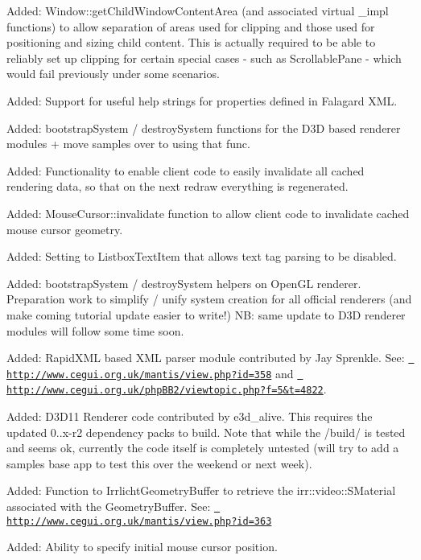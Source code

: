 \begin{DoxyItemize}
\item Added\+: Window\+::get\+Child\+Window\+Content\+Area (and associated virtual \+\_\+impl functions) to allow separation of areas used for clipping and those used for positioning and sizing child content. This is actually required to be able to reliably set up clipping for certain special cases -\/ such as Scrollable\+Pane -\/ which would fail previously under some scenarios.
\item Added\+: Support for useful help strings for properties defined in Falagard X\+ML.
\item Added\+: bootstrap\+System / destroy\+System functions for the D3D based renderer modules + move samples over to using that func.
\item Added\+: Functionality to enable client code to easily invalidate all cached rendering data, so that on the next redraw everything is regenerated.
\item Added\+: Mouse\+Cursor\+::invalidate function to allow client code to invalidate cached mouse cursor geometry.
\item Added\+: Setting to Listbox\+Text\+Item that allows text tag parsing to be disabled.
\item Added\+: bootstrap\+System / destroy\+System helpers on Open\+GL renderer. Preparation work to simplify / unify system creation for all official renderers (and make coming tutorial update easier to write!) NB\+: same update to D3D renderer modules will follow some time soon.
\item Added\+: Rapid\+X\+ML based X\+ML parser module contributed by Jay Sprenkle. See\+: \href{http://www.cegui.org.uk/mantis/view.php?id=358}{\texttt{ http\+://www.\+cegui.\+org.\+uk/mantis/view.\+php?id=358}} and \href{http://www.cegui.org.uk/phpBB2/viewtopic.php?f=5&t=4822}{\texttt{ http\+://www.\+cegui.\+org.\+uk/php\+B\+B2/viewtopic.\+php?f=5\&t=4822}}.
\item Added\+: D3\+D11 Renderer code contributed by e3d\+\_\+alive. This requires the updated 0..\+x-\/r2 dependency packs to build. Note that while the /build/ is tested and seems ok, currently the code itself is completely untested (will try to add a samples base app to test this over the weekend or next week).
\item Added\+: Function to Irrlicht\+Geometry\+Buffer to retrieve the irr\+::video\+::\+S\+Material associated with the Geometry\+Buffer. See\+: \href{http://www.cegui.org.uk/mantis/view.php?id=363}{\texttt{ http\+://www.\+cegui.\+org.\+uk/mantis/view.\+php?id=363}}
\item Added\+: Ability to specify initial mouse cursor position.

\end{DoxyItemize}
